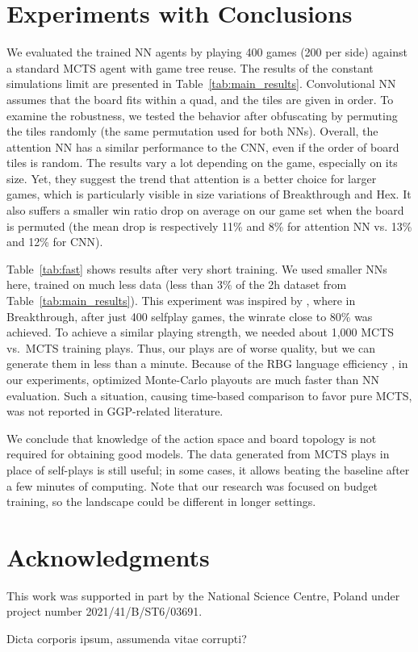 \documentclass[letterpaper]{article} %
\begin{document}
\section{Experiments with Conclusions}

We evaluated the trained NN agents by playing 400 games (200 per side) against a standard MCTS agent with game tree reuse. The results of the constant simulations limit are presented in Table~\ref{tab:main_results}.
Convolutional NN assumes that the board fits within a quad, and the tiles are given in order.
To examine the robustness, we tested the behavior after obfuscating by permuting the tiles randomly (the same permutation used for both NNs).
Overall, the attention NN has a similar performance to the CNN, even if the order of board tiles is random. The results vary a lot depending on the game, especially on its size.
Yet, they suggest the trend that attention is a better choice for larger games, which is particularly visible in size variations of Breakthrough and Hex.
It also suffers a smaller win ratio drop on average on our game set when the board is permuted (the mean drop is respectively 11\% and 8\% for attention NN vs. 13\% and 12\% for CNN).

Table~\ref{tab:fast} shows results after very short training.
We used smaller NNs here, trained on much less data (less than $3\%$ of the 2h dataset from Table~\ref{tab:main_results}).
This experiment was inspired by \cite{ThielscherAAAI20}, where in Breakthrough, after just 400 selfplay games, the winrate close to 80\% was achieved.
To achieve a similar playing strength, we needed about 1,000 MCTS vs.\ MCTS training plays. Thus, our plays are of worse quality, but we can generate them in less than a minute.
Because of the RBG language efficiency \cite{Kowalski2020EfficientReasoning}, in our experiments, optimized Monte-Carlo playouts are much faster than NN evaluation. Such a situation, causing time-based comparison to favor pure MCTS, was not reported in GGP-related literature.

We conclude that knowledge of the action space and board topology is not required for obtaining good models.
The data generated from MCTS plays in place of self-plays is still useful; in some cases, it allows beating the baseline after a few minutes of computing.
Note that our research was focused on budget training, so the landscape could be different in longer settings.




\section{Acknowledgments}
This work was supported in part by the National Science Centre, Poland under project number 2021/41/B/ST6/03691.

Dicta corporis ipsum, assumenda vitae corrupti?\clearpage

\end{document}
